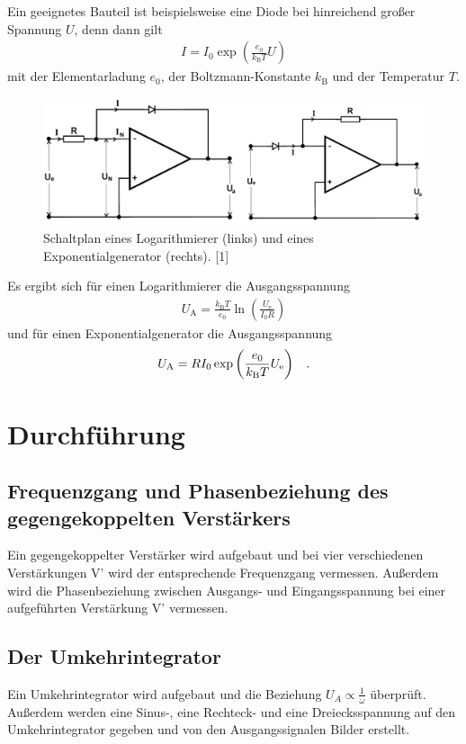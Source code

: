 \documentclass[]{scrartcl}
\let\oldsection\section
\renewcommand\section{\clearpage\oldsection}
\begin{document}
Ein geeignetes Bauteil ist beispielsweise eine Diode bei hinreichend großer Spannung $U$, denn dann gilt
\begin{align}
I=I_0 \exp \left(\frac{e_0}{k_\text{B} T}U\right)
\end{align}
mit der Elementarladung $e_0$, der Boltzmann-Konstante $k_\text{B}$ und der Temperatur $T$. 


\begin{figure}[H]
\centering
\includegraphics[width=15cm]{images/schaltplan_explog.png}
\caption{Schaltplan eines Logarithmierer (links) und eines Exponentialgenerator (rechts). [1]}
\label{fig:schalplan_explog}
\end{figure}

Es ergibt sich für einen Logarithmierer die Ausgangsspannung 
\begin{align}
U_\text{A}=\frac{k_\text{B}T}{e_0}\ln \left(\frac{U_\text{e}}{I_0 R}\right)
\end{align}
und für einen Exponentialgenerator die Ausgangsspannung
\begin{align}
U_\text{A}=RI_0\exp \left(\frac{e_0}{k_\text{B} T}U_\text{e}\right)\hspace{0.3cm}\text{.}
\end{align}

\newpage

\section{Durchführung}

\subsection{Frequenzgang und Phasenbeziehung des gegengekoppelten Verstärkers}
Ein gegengekoppelter Verstärker wird aufgebaut und bei vier verschiedenen Verstärkungen V' wird der entsprechende Frequenzgang vermessen. Außerdem wird die Phasenbeziehung zwischen Ausgangs- und Eingangsspannung bei einer aufgeführten Verstärkung V' vermessen.

\subsection{Der Umkehrintegrator}
Ein Umkehrintegrator wird aufgebaut und die Beziehung $U_A\propto\frac{1}{\omega}$ überprüft. Außerdem werden eine Sinus-, eine Rechteck- und eine Dreiecksspannung auf den Umkehrintegrator gegeben und von den Ausgangssignalen Bilder erstellt.
\end{document}

